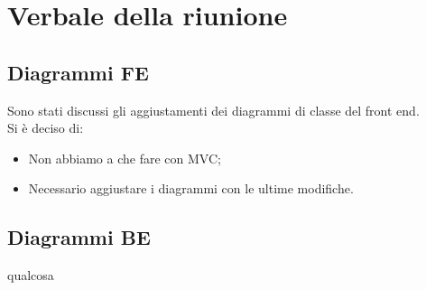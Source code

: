 \section{Verbale della riunione}

\subsection{Diagrammi FE}
Sono stati discussi gli aggiustamenti dei diagrammi di classe del front end.
\\Si è deciso di:
\begin{itemize}
	\item Non abbiamo a che fare con MVC;
	\item Necessario aggiustare i diagrammi con le ultime modifiche.
\end{itemize}


\subsection{Diagrammi BE}
qualcosa